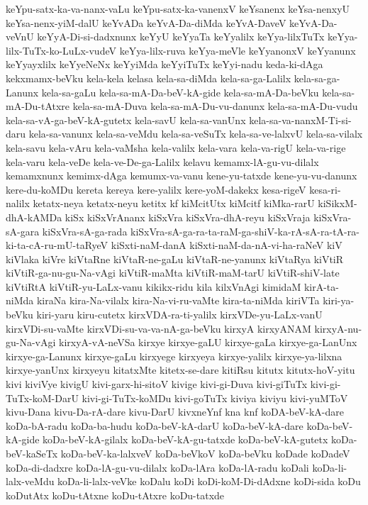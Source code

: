{keYpu-satx-ka-va-nanx-vaLu
keYpu-satx-ka-vanenxV
keYsanenx
keYsa-nenxyU
keYsa-nenx-yiM-dalU
keYvADa
keYvA-Da-diMda
keYvA-DaveV
keYvA-Da-veVnU
keYyA-Di-si-dadxnunx
keYyU
keYyaTa
keYyalilx
keYya-lilxTuTx
keYya-lilx-TuTx-ko-LuLx-vudeV
keYya-lilx-ruva
keYya-meVle
keYyanonxV
keYyanunx
keYyayxlilx
keYyeNeNx
keYyiMda
keYyiTuTx
keYyi-nadu
keda-ki-dAga
kekxmamx-beVku
kela-kela
kelasa
kela-sa-diMda
kela-sa-ga-Lalilx
kela-sa-ga-Lanunx
kela-sa-gaLu
kela-sa-mA-Da-beV-kA-gide
kela-sa-mA-Da-beVku
kela-sa-mA-Du-tAtxre
kela-sa-mA-Duva
kela-sa-mA-Du-vu-danunx
kela-sa-mA-Du-vudu
kela-sa-vA-ga-beV-kA-gutetx
kela-savU
kela-sa-vanUnx
kela-sa-va-nanxM-Ti-si-daru
kela-sa-vanunx
kela-sa-veMdu
kela-sa-veSuTx
kela-sa-ve-lalxvU
kela-sa-vilalx
kela-savu
kela-vAru
kela-vaMsha
kela-valilx
kela-vara
kela-va-rigU
kela-va-rige
kela-varu
kela-veDe
kela-ve-De-ga-Lalilx
kelavu
kemamx-lA-gu-vu-dilalx
kemamxnunx
kemimx-dAga
kemumx-va-vanu
kene-yu-tatxde
kene-yu-vu-danunx
kere-du-koMDu
kereta
kereya
kere-yalilx
kere-yoM-dakekx
kesa-rigeV
kesa-ri-nalilx
ketatx-neya
ketatx-neyu
ketitx
kf
kiMcitUtx
kiMcitf
kiMka-rarU
kiSikxM-dhA-kAMDa
kiSx
kiSxVrAnanx
kiSxVra
kiSxVra-dhA-reyu
kiSxVraja
kiSxVra-sA-gara
kiSxVra-sA-ga-rada
kiSxVra-sA-ga-ra-ta-raM-ga-shiV-ka-rA-sA-ra-tA-ra-ki-ta-cA-ru-mU-taRyeV
kiSxti-naM-danA
kiSxti-naM-da-nA-vi-ha-raNeV
kiV
kiVlaka
kiVre
kiVtaRne
kiVtaR-ne-gaLu
kiVtaR-ne-yanunx
kiVtaRya
kiVtiR
kiVtiR-ga-nu-gu-Na-vAgi
kiVtiR-maMta
kiVtiR-maM-tarU
kiVtiR-shiV-late
kiVtiRtA
kiVtiR-yu-LaLx-vanu
kikikx-ridu
kila
kilxVnAgi
kimidaM
kirA-ta-niMda
kiraNa
kira-Na-vilalx
kira-Na-vi-ru-vaMte
kira-ta-niMda
kiriVTa
kiri-ya-beVku
kiri-yaru
kiru-cutetx
kirxVDA-ra-ti-yalilx
kirxVDe-yu-LaLx-vanU
kirxVDi-su-vaMte
kirxVDi-su-va-va-nA-ga-beVku
kirxyA
kirxyANAM
kirxyA-nu-gu-Na-vAgi
kirxyA-vA-neVSa
kirxye
kirxye-gaLU
kirxye-gaLa
kirxye-ga-LanUnx
kirxye-ga-Lanunx
kirxye-gaLu
kirxyege
kirxyeya
kirxye-yalilx
kirxye-ya-lilxna
kirxye-yanUnx
kirxyeyu
kitatxMte
kitetx-se-dare
kitiRsu
kitutx
kitutx-hoV-yitu
kivi
kiviVye
kivigU
kivi-garx-hi-sitoV
kivige
kivi-gi-Duva
kivi-giTuTx
kivi-gi-TuTx-koM-DarU
kivi-gi-TuTx-koMDu
kivi-goTuTx
kiviya
kiviyu
kivi-yuMToV
kivu-Dana
kivu-Da-rA-dare
kivu-DarU
kivxneYnf
kna
knf
koDA-beV-kA-dare
koDa-bA-radu
koDa-ba-hudu
koDa-beV-kA-darU
koDa-beV-kA-dare
koDa-beV-kA-gide
koDa-beV-kA-gilalx
koDa-beV-kA-gu-tatxde
koDa-beV-kA-gutetx
koDa-beV-kaSeTx
koDa-beV-ka-lalxveV
koDa-beVkoV
koDa-beVku
koDade
koDadeV
koDa-di-dadxre
koDa-lA-gu-vu-dilalx
koDa-lAra
koDa-lA-radu
koDali
koDa-li-lalx-veMdu
koDa-li-lalx-veVke
koDalu
koDi
koDi-koM-Di-dAdxne
koDi-sida
koDu
koDutAtx
koDu-tAtxne
koDu-tAtxre
koDu-tatxde
}
